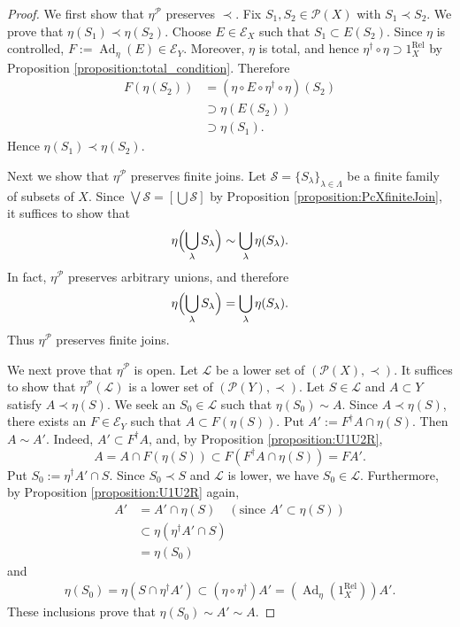 \documentclass[12pt, a4paper]{amsart}
\theoremstyle{definition}
\newcommand{\Ad}{\mathop{\mathrm{Ad}}\nolimits}
\newcommand{\Rel}{\mathrm{Rel}}
\begin{document}
\begin{proof}
We first show that
$\eta^{\mathcal{P}}$
preserves
$\prec$.
Fix
$S_1,S_2\in\mathcal{P}(X)$
with
$S_1\prec S_2$.
We prove that
$\eta(S_1)\prec\eta(S_2)$.
Choose
$E\in\mathcal E_X$
such that
$S_1\subset E(S_2)$.
Since
$\eta$
is controlled,
$F:=\Ad_\eta(E)\in\mathcal E_Y$.
Moreover,
$\eta$
is total, and hence
$\eta^\dagger\circ\eta\supset1_X^{\Rel}$
by Proposition \ref{proposition:total_condition}.
Therefore
\begin{align*}
F(\eta(S_2))
    &= (\eta\circ E\circ\eta^\dagger\circ\eta)(S_2) \\
    &\supset \eta(E(S_2)) \\
    &\supset \eta(S_1).
\end{align*}
Hence
$\eta(S_1)\prec\eta(S_2)$.

Next we show that
$\eta^{\mathcal{P}}$
preserves finite joins.
Let
$\mathcal{S}=\{S_\lambda\}_{\lambda\in\Lambda}$
be a finite family of subsets of $X$.
Since
$\bigvee\mathcal{S}=[\bigcup\mathcal{S}]$
by Proposition \ref{proposition:PcXfiniteJoin},
it suffices to show that
\[
\eta\Bigl(\bigcup_{\lambda}S_\lambda\Bigr)
\sim
\bigcup_{\lambda}\eta(S_\lambda).
\]
In fact,
$\eta^{\mathcal{P}}$
preserves arbitrary unions, and therefore
\[
\eta\Bigl(\bigcup_{\lambda}S_\lambda\Bigr)
=
\bigcup_{\lambda}\eta(S_\lambda).
\]
Thus
$\eta^{\mathcal{P}}$
preserves finite joins.

We next prove that $\eta^\mathcal{P}$ is open. Let $\mathcal{L}$ be a lower set of $(\mathcal{P}(X),\prec)$. It suffices to show that $\eta^{\mathcal{P}}(\mathcal{L})$ is a lower set of $(\mathcal{P}(Y),\prec)$. Let $S \in \mathcal{L}$ and $A \subset Y$ satisfy $A \prec \eta(S)$. We seek an $S_0 \in \mathcal{L}$ such that $\eta(S_0) \sim A$. Since $A \prec \eta(S)$, there exists an $F \in \mathcal{E}_Y$ such that $A \subset F(\eta(S))$. Put $A' := F^\dagger A\cap \eta(S)$. Then $A \sim A'$. Indeed, $A' \subset F^\dagger A$, and, by Proposition \ref{proposition:U1U2R},
\[
A = A \cap F(\eta(S)) \subset F(F^\dagger A \cap \eta(S)) = F A'.
\]
Put $S_0 :=\eta^\dagger A'\cap S$. Since $S_0 \prec S$ and $\mathcal{L}$ is lower, we have $S_0 \in \mathcal{L}$. Furthermore, by Proposition \ref{proposition:U1U2R} again,
\begin{align*}
A' 
    &= A'\cap \eta(S) \quad (\text{since } A' \subset \eta(S)) \\
    &\subset \eta(\eta^\dagger A'\cap  S) \\
    &= \eta(S_0)
\end{align*}
and
\begin{align*}
\eta(S_0) = \eta(S \cap \eta^\dagger A') \subset (\eta \circ \eta^\dagger) A' = (\Ad_{\eta}(1^\Rel_{X})) A'.
\end{align*}
These inclusions prove that $\eta(S_0) \sim A' \sim A$.


\end{proof}
\end{document}
